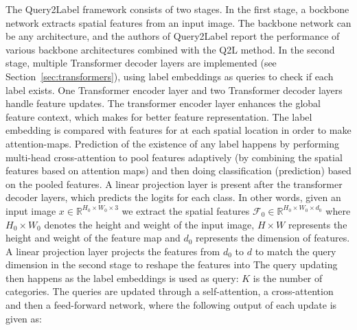 \documentclass[lettersize,journal]{IEEEtran}
\begin{document}


The Query2Label framework consists of two stages. In the first stage, a bockbone network extracts spatial features from an input image. The backbone network can be any architecture, and the authors of Query2Label report the performance of various backbone architectures combined with the Q2L method. In the second stage, multiple Transformer decoder layers are implemented (see Section~\ref{sec:transformers}), using label embeddings as queries to check if each label exists. One Transformer encoder layer and two Transformer decoder layers handle feature updates. The transformer encoder layer enhances the global feature context, which makes for better feature representation. The label embedding is compared with features for at each spatial location in order to make attention-maps. Prediction of the existence of any label happens by performing multi-head cross-attention to pool features adaptively (by combining the spatial features based on attention maps) and then doing classification (prediction) based on the pooled features. A linear projection layer is present after the transformer decoder layers, which predicts the logits for each class. In other words, given an input image $x\in \mathbb{R}^{H_0\times W_0\times 3}$ we extract the spatial features $\mathcal{F}_0\in \mathbb{R}^{H_0\times W_0\times d_0}$ where $H_0 \times W_0$ denotes the height and weight of the input image, $H \times W$ represents the height and weight of the feature map and $d_0$ represents the dimension of features. A linear projection layer projects the features from $d_0$ to $d$ to match the query dimension in the second stage to reshape the features into 
The query updating then happens as the label embeddings is used as query: 
$K$ is the number of categories. The queries are updated through a self-attention, a cross-attention and then a feed-forward network, where the following output of each update is given as:
\end{document}
